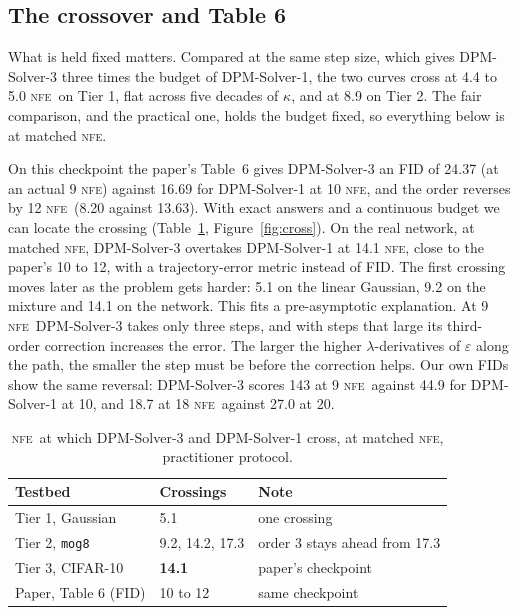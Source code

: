 \documentclass[sigconf]{acmart}
\newcommand{\NFE}{\textsc{nfe}}
\newcommand{\eps}{\varepsilon}
\newcommand{\lam}{\lambda}
\begin{document}
\subsection{The crossover and Table 6}
\label{sec:crossover}

What is held fixed matters. Compared at the same step size, which gives
DPM-Solver-3 three times the budget of DPM-Solver-1, the two curves cross at 4.4 to
5.0 \NFE\ on Tier 1, flat across five decades of $\kappa$, and at 8.9 on Tier 2. The
fair comparison, and the practical one, holds the budget fixed, so everything below
is at matched \NFE.

On this checkpoint the paper's Table~6 gives DPM-Solver-3 an FID of 24.37 (at an
actual 9 \NFE) against 16.69 for DPM-Solver-1 at 10 \NFE, and the order reverses by
12 \NFE\ (8.20 against 13.63). With exact answers and a continuous budget we can
locate the crossing (Table~\ref{tab:cross}, Figure~\ref{fig:cross}). On the real
network, at matched \NFE, DPM-Solver-3 overtakes DPM-Solver-1 at 14.1 \NFE, close to
the paper's 10 to 12, with a trajectory-error metric instead of FID. The first
crossing moves later as the problem gets harder: 5.1 on the linear Gaussian, 9.2 on
the mixture and 14.1 on the network. This fits a pre-asymptotic explanation. At 9
\NFE\ DPM-Solver-3 takes only three steps, and with steps that large its third-order
correction increases the error. The larger the higher $\lam$-derivatives of $\eps$
along the path, the smaller the step must be before the correction helps. Our own
FIDs show the same reversal: DPM-Solver-3 scores 143 at 9 \NFE\ against 44.9 for
DPM-Solver-1 at 10, and 18.7 at 18 \NFE\ against 27.0 at 20.

\begin{table}[t]
\caption{\NFE\ at which DPM-Solver-3 and DPM-Solver-1 cross, at matched \NFE,
practitioner protocol.}
\label{tab:cross}
\small
\begin{tabular}{@{}lll@{}}
\toprule
Testbed & Crossings & Note \\
\midrule
Tier 1, Gaussian & 5.1 & one crossing \\
Tier 2, \texttt{mog8} & 9.2, 14.2, 17.3 & order 3 stays ahead from 17.3 \\
Tier 3, CIFAR-10 & \textbf{14.1} & paper's checkpoint \\
Paper, Table 6 (FID) & 10 to 12 & same checkpoint \\
\bottomrule
\end{tabular}
\end{table}
\end{document}
